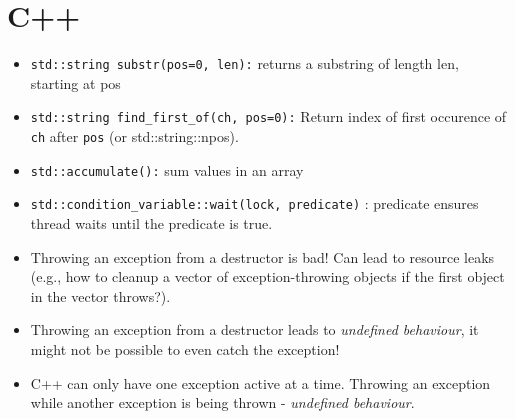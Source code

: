 \documentclass[12pt]{article}
\begin{document}
\section{C++}
\begin{itemize}
\item \texttt{std::string substr(pos=0, len):} returns a substring of length len, starting at pos
\item \texttt{std::string find\_first\_of(ch, pos=0):} Return index of first occurence of
\texttt{ch} after \texttt{pos} (or std::string::npos).
\item \texttt{std::accumulate():} sum values in an array
\item \texttt{std::condition\_variable::wait(lock, predicate)} : predicate ensures thread waits until the predicate is true.
\item Throwing an exception from a destructor is bad! Can lead to resource leaks (e.g., how to cleanup a vector of exception-throwing objects if the first object in the vector throws?).
\item Throwing an exception from a destructor leads to \emph{undefined behaviour}, it might not be possible to even catch the exception!
\item C++ can only have one exception active at a time. Throwing an exception while another exception is being thrown - \emph{undefined behaviour}.
\end{itemize}
\end{document}

